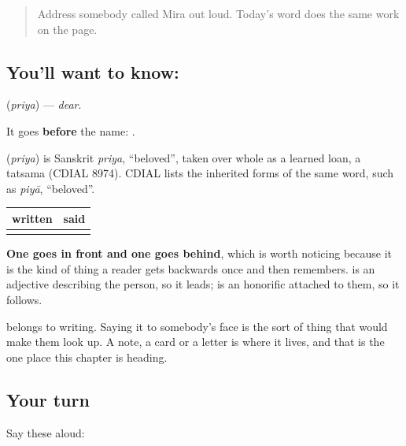 \label{lesson:HI-C97-priya}



\begin{quote}
Address somebody called Mira out loud. Today's word does the same work on the page.
\end{quote}

\subsection*{You'll want to know: }
\textbf{} (\emph{priya}) — \emph{dear}.

It goes \textbf{before} the name: \textbf{ }.

\begin{cousinweb}
\textbf{} (\emph{priya}) is Sanskrit \emph{priya}, \textquotedblleft{}beloved\textquotedblright{}, taken over whole as a learned loan, a tatsama (CDIAL 8974). CDIAL lists the inherited forms of the same word, such as \emph{piyā}, \textquotedblleft{}beloved\textquotedblright{}.
\end{cousinweb}

\begin{grammarlens}[title={Grammar Lens: the opposite side of the name}]
\noindent
\begin{tabularx}{\linewidth}{@{}>{\raggedright\arraybackslash}X>{\raggedright\arraybackslash}X@{}}
\toprule
\textbf{written} & \textbf{said} \\
\midrule
\hi{प्रिय} \hi{मीरा} & \hi{मीरा} \hi{जी} \\
\bottomrule
\end{tabularx}

\textbf{One goes in front and one goes behind}, which is worth noticing because it is the kind of thing a reader gets backwards once and then remembers. \textbf{} is an adjective describing the person, so it leads; \textbf{} is an honorific attached to them, so it follows.

\textbf{} belongs to writing. Saying it to somebody's face is the sort of thing that would make them look up. A note, a card or a letter is where it lives, and that is the one place this chapter is heading.
\end{grammarlens}

\subsection*{Your turn}
Say these aloud:

